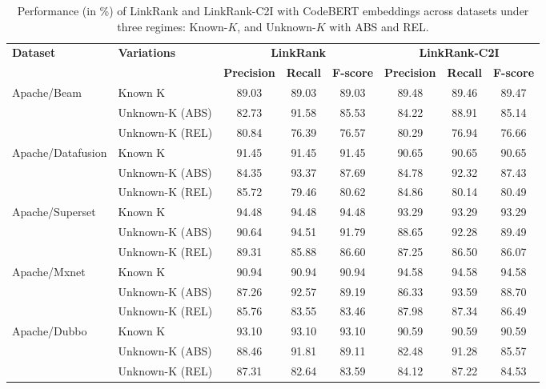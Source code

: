 \begin{table}[htbp]
\centering
\caption{Performance (in \%) of LinkRank and LinkRank-C2I with CodeBERT embeddings across datasets under three regimes: Known-$K$, and Unknown-$K$ with ABS and REL.}
\renewcommand{\arraystretch}{1.3}
\label{rq1}
\begin{tabular}{@{}llcccccc@{}}
\toprule
\multirow{2}{*}{\textbf{Dataset}} & \multirow{2}{*}{\textbf{Variations}} & \multicolumn{3}{c}{\textbf{LinkRank}} & \multicolumn{3}{c}{\textbf{LinkRank-C2I}} \\
\cmidrule(lr){3-5} \cmidrule(lr){6-8}
 &  & \textbf{Precision} & \textbf{Recall} & \textbf{F-score} & \textbf{Precision} & \textbf{Recall} & \textbf{F-score} \\
\midrule

\multirow{3}{*}{Apache/Beam}
 & Known K           & 89.03 & 89.03 & 89.03 & 89.48 & 89.46 & 89.47 \\
 & Unknown-K (ABS)   & 82.73 & 91.58 & 85.53 & 84.22 & 88.91 & 85.14 \\
 & Unknown-K (REL)   & 80.84 & 76.39 & 76.57 & 80.29 & 76.94 & 76.66 \\
\midrule

\multirow{3}{*}{Apache/Datafusion}
 & Known K           & 91.45 & 91.45 & 91.45 & 90.65 & 90.65 & 90.65 \\
 & Unknown-K (ABS)   & 84.35 & 93.37 & 87.69 & 84.78 & 92.32 & 87.43 \\
 & Unknown-K (REL)   & 85.72 & 79.46 & 80.62 & 84.86 & 80.14 & 80.49 \\
\midrule

\multirow{3}{*}{Apache/Superset}
 & Known K           & 94.48 & 94.48 & 94.48 & 93.29 & 93.29 & 93.29 \\
 & Unknown-K (ABS)   & 90.64 & 94.51 & 91.79 & 88.65 & 92.28 & 89.49 \\
 & Unknown-K (REL)   & 89.31 & 85.88 & 86.60 & 87.25 & 86.50 & 86.07 \\
\midrule

\multirow{3}{*}{Apache/Mxnet}
 & Known K           & 90.94 & 90.94 & 90.94 & 94.58 & 94.58 & 94.58 \\
 & Unknown-K (ABS)   & 87.26 & 92.57 & 89.19 & 86.33 & 93.59 & 88.70 \\
 & Unknown-K (REL)   & 85.76 & 83.55 & 83.46 & 87.98 & 87.34 & 86.49 \\
\midrule

\multirow{3}{*}{Apache/Dubbo}
 & Known K           & 93.10 & 93.10 & 93.10 & 90.59 & 90.59 & 90.59 \\
 & Unknown-K (ABS)   & 88.46 & 91.81 & 89.11 & 82.48 & 91.28 & 85.57 \\
 & Unknown-K (REL)   & 87.31 & 82.64 & 83.59 & 84.12 & 87.22 & 84.53 \\
\midrule


\end{tabular}
\end{table}
